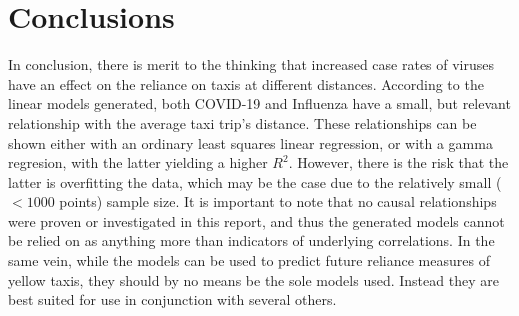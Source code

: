 \documentclass[11pt]{article}
\begin{document}




\section{Conclusions}

In conclusion, there is merit to the thinking that increased case rates of viruses 
have an effect on the reliance on taxis at different distances.
According to the linear models generated, 
both COVID-19 and Influenza have a small, but relevant relationship with the average taxi trip's distance.
These relationships can be shown either with an ordinary least squares linear regression,
or with a gamma regresion, with the latter yielding a higher $R^2$.
However, there is the risk that the latter is overfitting the data,
which may be the case due to the relatively small ($< 1000$ points) sample size.
It is important to note that no causal relationships were proven or investigated in this report,
and thus the generated models cannot be relied on as anything more than indicators
of underlying correlations. In the same vein, 
while the models can be used to predict future reliance measures of yellow taxis,
they should by no means be the sole models used. 
Instead they are best suited for use in conjunction with several others.
\end{document}
